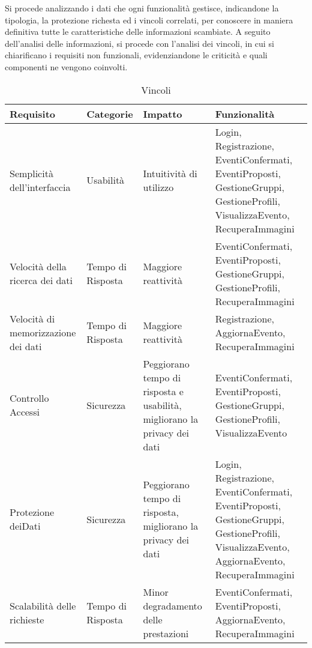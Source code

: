 Si procede analizzando i dati che ogni funzionalità gestisce, indicandone la tipologia, la protezione richesta ed i vincoli correlati,
per conoscere in maniera definitiva tutte le caratteristiche delle informazioni scambiate.
A seguito dell'analisi delle informazioni, si procede con l'analisi dei vincoli,
in cui si chiarificano i requisiti non funzionali, evidenziandone le criticità e quali componenti ne vengono coinvolti.

\begin{table}[htbp]
    \centering
    \begin{tabular} {|P{3.5cm}|P{2cm}|P{3.5cm}|P{6cm}|}
        \hline
        \textbf{Requisito}                  & \textbf{Categorie} & \textbf{Impatto}                                                         & \textbf{Funzionalità}                                                                                                                       \\
        \hline
        Semplicità dell'interfaccia         & Usabilità          & Intuitività di utilizzo                                                  & Login, Registrazione, EventiConfermati, EventiProposti, GestioneGruppi, GestioneProfili, VisualizzaEvento, RecuperaImmagini                 \\
        \hline
        Velocità della ricerca dei dati     & Tempo di Risposta  & Maggiore reattività                                                      & EventiConfermati, EventiProposti, GestioneGruppi, GestioneProfili, RecuperaImmagini                                                         \\
        \hline
        Velocità di memorizzazione dei dati & Tempo di Risposta  & Maggiore reattività                                                      & Registrazione, AggiornaEvento, RecuperaImmagini                                                                                             \\
        \hline
        Controllo Accessi                   & Sicurezza          & Peggiorano tempo di risposta e usabilità, migliorano la privacy dei dati & EventiConfermati, EventiProposti, GestioneGruppi, GestioneProfili, VisualizzaEvento                                                         \\
        \hline
        Protezione dei\linebreak Dati       & Sicurezza          & Peggiorano tempo di risposta, migliorano la privacy dei dati             & Login, Registrazione, EventiConfermati, EventiProposti, GestioneGruppi, GestioneProfili, VisualizzaEvento, AggiornaEvento, RecuperaImmagini \\
        \hline
        Scalabilità delle richieste         & Tempo di Risposta  & Minor degradamento delle prestazioni                                     & EventiConfermati, EventiProposti, AggiornaEvento, RecuperaImmagini                                                                          \\
        \hline
    \end{tabular}
    \caption{Vincoli}
\end{table}
\clearpage

